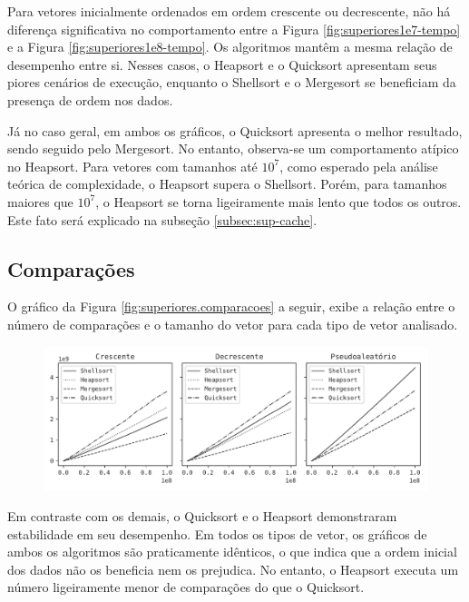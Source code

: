 Para vetores inicialmente ordenados em ordem crescente ou decrescente, não há diferença significativa no comportamento entre a Figura \ref{fig:superiores1e7-tempo} e a Figura \ref{fig:superiores1e8-tempo}. Os algoritmos mantêm a mesma relação de desempenho entre si. Nesses casos, o Heapsort e o Quicksort apresentam seus piores cenários de execução, enquanto o Shellsort e o Mergesort se beneficiam da presença de ordem nos dados.

Já no caso geral, em ambos os gráficos, o Quicksort apresenta o melhor resultado, sendo seguido pelo Mergesort. No entanto, observa-se um comportamento atípico no Heapsort. Para vetores com tamanhos até $10^7$, como esperado pela análise teórica de complexidade, o Heapsort supera o Shellsort. Porém, para tamanhos maiores que $10^7$, o Heapsort se torna ligeiramente mais lento que todos os outros. Este fato será explicado na subseção \ref{subsec:sup-cache}.

\subsection{Comparações}
O gráfico da Figura \ref{fig:superiores.comparacoes} a seguir, exibe a relação entre o número de comparações e o tamanho do vetor para cada tipo de vetor analisado.

\begin{figure}[H]
\centering
\includegraphics[scale=0.787]{figuras/pdf/superiores.comparacoes.pdf}
\end{figure}

Em contraste com os demais, o Quicksort e o Heapsort demonstraram estabilidade em seu desempenho. Em todos os tipos de vetor, os gráficos de ambos os algoritmos são praticamente idênticos, o que indica que a ordem inicial dos dados não os beneficia nem os prejudica. No entanto, o Heapsort executa um número ligeiramente menor de comparações do que o Quicksort.


